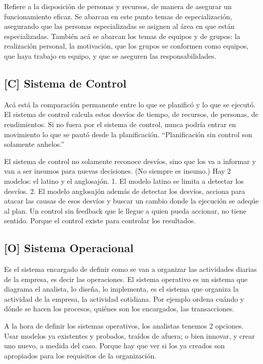Refiere a la disposición de personas y recursos, de manera de asegurar
un funcionamiento eficaz. Se abarcan en este punto temas de
especialización, asegurando que las personas especializadas se asignen
al área en que están especializadas. También acá se abarcan los temas de
equipos y de grupos: la realización personal, la motivación, que los
grupos se conformen como equipos, que haya trabajo en equipo, y que se
aseguren las responsabilidades.

\hypertarget{sistema-de-control}{%
\subsection{{[}C{]} Sistema de Control}\label{sistema-de-control}}

Acá está la comparación permanente entre lo que se planificó y lo que se
ejecutó. El sistema de control calcula estos desvíos de tiempo, de
recursos, de personas, de rendimientos. Si no fuera por el sistema de
control, nunca podría entrar en movimiento lo que se pautó desde la
planificación. ``Planificación sin control son solamente anhelos.''

El sistema de control no solamente reconoce desvíos, sino que los va a
informar y van a ser insumos para nuevas decisiones. (No siempre es
insumo.) Hay 2 modelos: el latino y el anglosajón. 1. El modelo latino se
limita a detectar los desvíos. 2. El modelo anglosajón además de detectar los desvíos, acciona para atacar
las causas de esos desvíos y buscar un cambio donde la ejecución se
adeqúe al plan. Un control sin feedback que le llegue a quien pueda
accionar, no tiene sentido. Porque el control existe para controlar los
resultados.

\hypertarget{sistema-operativo}{%
\subsection{{[}O{]} Sistema Operacional}\label{sistema-operativo}}

Es el sistema encargado de definir como se van a organizar las
actividades diarias de la empresa, es decir las operaciones. El sistema
operativo es un sistema que diagrama el analista, lo diseña, lo
implementa, es el sistema que organiza la actividad de la empresa, la
actividad cotidiana. Por ejemplo ordena cuándo y dónde se hacen los
procesos, quiénes son los encargados, las transacciones.

A la hora de definir los sistemas operativos, los analistas tenemos 2
opciones. Usar modelos ya existentes y probados, traídos de afuera; o
bien innovar, y crear uno nuevo, a medida del caso. Porque hay que ver
si los ya creados son apropiados para los requisitos de la organización.

